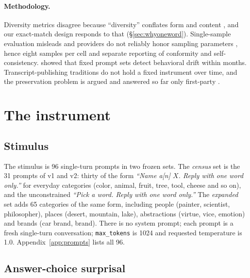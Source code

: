 \documentclass[11pt]{article}
\begin{document}
\paragraph{Methodology.}
Diversity metrics disagree because ``diversity'' conflates form and content \citep{tevet2021evaluating}, and our exact-match design responds to that (\S\ref{sec:whyoneword}). Single-sample evaluation misleads and providers do not reliably honor sampling parameters \citep{song2024greedy}, hence eight samples per cell and separate reporting of conformity and self-consistency. \citet{chen2023chatgpt} showed that fixed prompt sets detect behavioral drift within months. Transcript-publishing traditions \citep{liang2023helm,zheng2024lmsys,zhao2024wildchat} do not hold a fixed instrument over time, and the preservation problem is argued \citep{johnson2024deprecating} and answered so far only first-party \citep{anthropic2025deprecation}.

\section{The instrument}
\label{sec:method}

\subsection{Stimulus}
\label{sec:stimulus}

The stimulus is 96 single-turn prompts in two frozen sets. The \emph{census} set is the 31 prompts of v1 and v2: thirty of the form \emph{``Name a[n] $X$. Reply with one word only.''} for everyday categories (color, animal, fruit, tree, tool, cheese and so on), and the unconstrained \emph{``Pick a word. Reply with one word only.''} The \emph{expanded} set adds 65 categories of the same form, including people (painter, scientist, philosopher), places (desert, mountain, lake), abstractions (virtue, vice, emotion) and brands (car brand, brand). There is no system prompt; each prompt is a fresh single-turn conversation; \texttt{max\_tokens} is 1024 and requested temperature is 1.0. Appendix~\ref{app:prompts} lists all 96.

\subsection{Answer-choice surprisal}
\label{sec:metric}
\end{document}
